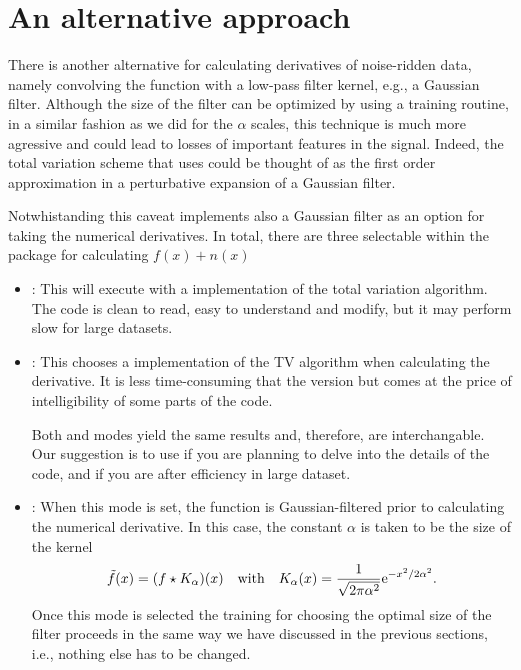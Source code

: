 \documentclass[letterpaper,10pt,openany,oneside]{sphinxmanual}
\begin{document}
\section{An alternative approach}
\label{method:an-alternative-approach}
There is another alternative for calculating derivatives of
noise-ridden data, namely convolving the function with a low-pass
filter kernel, e.g., a Gaussian filter. Although the size of the
filter can be optimized by using a training routine, in a similar
fashion as we did for the \(\alpha\) scales, this technique is much
more agressive and could lead to losses of important features in the
signal. Indeed, the total variation scheme that  uses could
be thought of as the first order approximation in a perturbative
expansion of a Gaussian filter.

Notwhistanding this caveat  implements also a Gaussian
filter as an option for taking the numerical derivatives. In total,
there are three selectable  within the package for
calculating \(f(x) + n(x)\)
\begin{itemize}
\item {} 
: This will execute
 with a  implementation of the total variation
algorithm. The code is clean to read, easy to understand and modify,
but it may perform slow for large datasets.

\item {} 
: This chooses a 
implementation of the TV algorithm when calculating the
derivative. It is less time-consuming that the  version
but comes at the price of intelligibility of some parts of the
code.

Both  and  modes yield the same results and,
therefore, are interchangable. Our suggestion is to use 
if you are planning to delve into the details of the code, and 
if you are after efficiency in large dataset.

\item {} 
: When this mode is set,
the function is Gaussian-filtered prior to calculating the numerical
derivative. In this case, the constant \(\alpha\) is taken to be
the size of the kernel
\label{method:equation-kernel}\begin{gather}
\begin{split}\tilde{f}(x) = (f \star K_\alpha)(x) \quad\mbox{with}\quad
     K_\alpha(x) = \frac{1}{\sqrt{2\pi \alpha^2}}{\rm e}^{-x^2/2\alpha^2}.\end{split}\label{method-kernel}
\end{gather}
Once this mode is selected the training for choosing the optimal
size of the filter proceeds in the same way we have discussed in the
previous sections, i.e., nothing else has to be changed.

\end{itemize}



\renewcommand{\indexname}{Index}
\printindex
\end{document}
